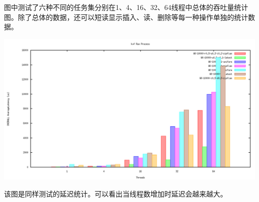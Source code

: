 	图中测试了六种不同的任务集分别在1、4、16、32、64线程中总体的吞吐量统计图。除了总体的数据，还可以短读显示插入、读、删除等每一种操作单独的统计数据。

\begin{center}
	\includegraphics[width=13.9cm]{img/figure15.pdf}
\end{center}

	该图是同样测试的延迟统计。可以看出当线程数增加时延迟会越来越大。



	


















